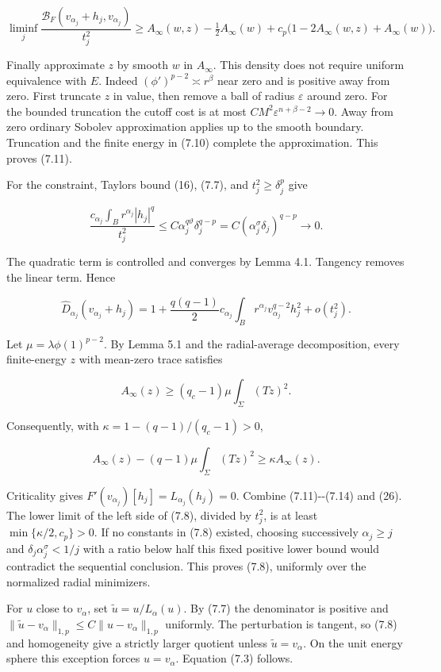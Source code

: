 \documentclass[11pt]{article}
\begin{document}
\[
\liminf_j\frac{\mathcal B_F(v_{\alpha_j}+h_j,v_{\alpha_j})}{t_j^2}
\ge A_\infty(w,z)-\tfrac12A_\infty(w)
+c_p\bigl(1-2A_\infty(w,z)+A_\infty(w)\bigr).
\]

Finally approximate \(z\) by smooth \(w\) in \(A_\infty\). This density
does not require uniform equivalence with \(E\). Indeed
\((\phi')^{p-2}\asymp r^\beta\) near zero and is positive away from
zero. First truncate \(z\) in value, then remove a ball of radius
\(\varepsilon\) around zero. For the bounded truncation the cutoff cost
is at most \(CM^2\varepsilon^{n+\beta-2}\to0\). Away from zero ordinary
Sobolev approximation applies up to the smooth boundary. Truncation and
the finite energy in (7.10) complete the approximation. This proves
(7.11).

For the constraint, Taylor\textquotesingle s bound (16), (7.7), and
\(t_j^2\ge\delta_j^p\) give

\[
\frac{c_{\alpha_j}\int_Br^{\alpha_j}|h_j|^q}{t_j^2}
\le C\alpha_j^{q\vartheta}\delta_j^{q-p}
=C(\alpha_j^\sigma\delta_j)^{q-p}\longrightarrow0.
\tag{7.12}
\]

The quadratic term is controlled and converges by Lemma 4.1. Tangency
removes the linear term. Hence

\[
\widehat D_{\alpha_j}(v_{\alpha_j}+h_j)
=1+\frac{q(q-1)}2c_{\alpha_j}\int_Br^{\alpha_j}v_{\alpha_j}^{q-2}h_j^2
+o(t_j^2).
\tag{7.13}
\]

Let \(\mu=\lambda\phi(1)^{p-2}\). By Lemma 5.1 and the radial-average
decomposition, every finite-energy \(z\) with mean-zero trace satisfies

\[
A_\infty(z)\ge(q_c-1)\mu\int_\Sigma(Tz)^2.
\]

Consequently, with \(\kappa=1-(q-1)/(q_c-1)>0\),

\[
A_\infty(z)-(q-1)\mu\int_\Sigma(Tz)^2
\ge\kappa A_\infty(z).
\tag{7.14}
\]

Criticality gives \(F'(v_{\alpha_j})[h_j]=L_{\alpha_j}(h_j)=0\). Combine
(7.11)-\/-(7.14) and (26). The lower limit of the left side of (7.8),
divided by \(t_j^2\), is at least \(\min\{\kappa/2,c_p\}>0\). If no
constants in (7.8) existed, choosing successively \(\alpha_j\ge j\) and
\(\delta_j\alpha_j^\sigma<1/j\) with a ratio below half this fixed
positive lower bound would contradict the sequential conclusion. This
proves (7.8), uniformly over the normalized radial minimizers.

For \(u\) close to \(v_\alpha\), set \(\widetilde u=u/L_\alpha(u)\). By
(7.7) the denominator is positive and
\(\|\widetilde u-v_\alpha\|_{1,p}\le C\|u-v_\alpha\|_{1,p}\) uniformly.
The perturbation is tangent, so (7.8) and homogeneity give a strictly
larger quotient unless \(\widetilde u=v_\alpha\). On the unit energy
sphere this exception forces \(u=v_\alpha\). Equation (7.3) follows.
\end{document}
